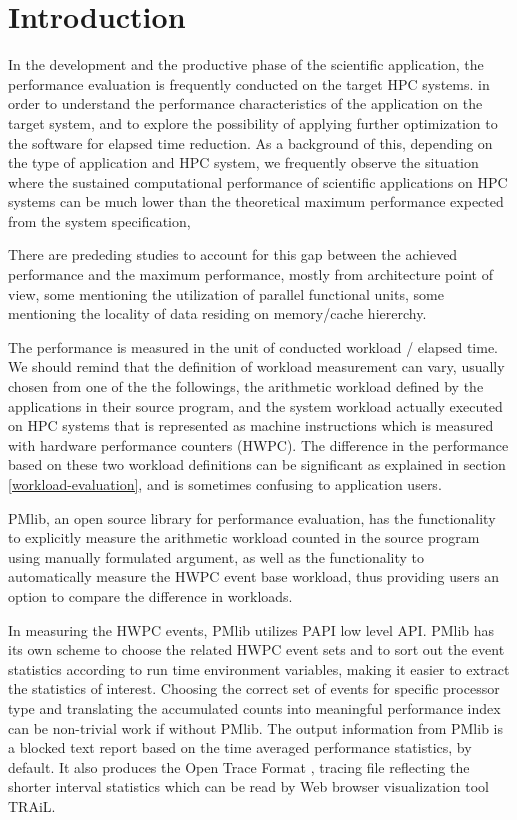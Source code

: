\documentclass[conference]{IEEEtran}
\begin{document}
\section{Introduction}
In the development and the productive phase of the scientific application,
the performance evaluation is frequently conducted on the target HPC systems.
in order to understand the performance characteristics
of the application on the target system, and to explore the possibility of
applying further optimization to the software for elapsed time reduction.
As a background of this,
depending on the type of application and HPC system,
we frequently observe the situation where
the sustained computational performance of scientific applications on HPC
systems can be much lower than the theoretical maximum performance
expected from the system specification,

There are prededing studies to account for this gap between the achieved
performance and the maximum performance, mostly from architecture
point of view,
some mentioning the utilization of parallel functional units,
some mentioning the locality of data residing on memory/cache hiererchy.

The performance is measured in the unit of conducted workload / elapsed time.
We should remind that the definition of workload measurement can vary,
usually chosen from one of the the followings,
the arithmetic workload defined by the applications in their source program,
and the system workload actually executed on HPC systems that is represented
as machine instructions which is measured with hardware performance counters
(HWPC).
The difference in the performance based on these two workload definitions
can be significant as explained in section \ref{workload-evaluation},
and is sometimes confusing to application users.

PMlib, an open source library for performance evaluation,
\cite{PMlib:webpage-public}
has the functionality
to explicitly measure the arithmetic workload counted in the source program
using manually formulated argument, as well as the functionality
to automatically measure the HWPC event base workload,
thus providing users an option to compare the difference in workloads.

In measuring the HWPC events, PMlib utilizes PAPI \cite{PAPI:5.6} low level API.
PMlib has its own scheme to choose the related HWPC event sets and to sort out
the event statistics according to run time environment variables, making it
easier to extract the statistics of interest.
Choosing the correct set of events for specific processor type and
translating the accumulated counts into meaningful performance index can be
non-trivial work if without PMlib.
The output information from PMlib is a blocked text report based on
the time averaged performance statistics, by default.
It also produces the Open Trace Format
\cite{Knupfer:2006}, \cite{OTF:webpage-public}
tracing file reflecting
the shorter interval statistics which can be read by Web browser
visualization tool TRAiL.%
\end{document}
